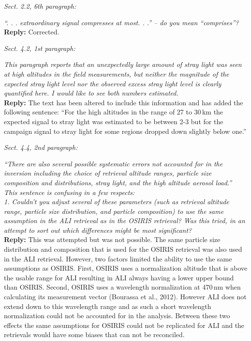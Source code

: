 \documentclass[12pt, notitlepage]{article}
\begin{document}
\textit{Sect. 2.2, 6th paragraph:}

\textit{``. . . extraordinary signal compresses at most. . .'' – do you mean ``comprises''?}\\

\textbf{Reply:} Corrected.

\hrulefill

\textit{Sect. 4.2, 1st paragraph:}

\textit{This paragraph reports that an unexpectedly large amount of stray light was seen at
high altitudes in the field measurements, but neither the magnitude of the expected
stray light level nor the observed excess stray light level is clearly quantified here. I
would like to see both numbers estimated.}\\

\textbf{Reply:} The text has been altered to include this information and has added the following sentence: ``For the high altitudes in the range of 27 to 30\,\unit{km} the expected signal to stray light was estimated to be between 2-3 but for the campaign signal to stray light for some regions dropped down slightly below one.''

\hrulefill

\textit{Sect. 4.4, 2nd paragraph:}

\textit{``There are also several possible systematic errors not accounted for in the inversion
including the choice of retrieval altitude ranges, particle size composition and distributions,
stray light, and the high altitude aerosol load.''}\\

\textit{This sentence is confusing in a few respects:}\\

\textit{1. Couldn't you adjust several of these parameters (such as retrieval altitude range,
particle size distribution, and particle composition) to use the same assumption in the
ALI retrieval as in the OSIRIS retrieval? Was this tried, in an attempt to sort out which
differences might be most significant?}\\

\textbf{Reply:} This was attempted but was not possible. The same particle size distribution and composition
that is used for the OSIRIS retrieval was also used in the ALI retrieval.  However, two factors limited the ability to use the same assumptions as OSIRIS. First, OSIRIS uses a normalization altitude that is above the usable range for ALI resulting in ALI always having a lower upper bound than OSIRIS. Second, OSIRIS uses a wavelength normalization at 470\,nm when calculating its measurement vector (Bourassa et al., 2012). However ALI does not extend down to this wavelength range and as such a short wavelength normalization could not be accounted for in the analysis. Between these two effects the same assumptions for OSIRIS could not be replicated for ALI and the retrievals would have some biases that can not be reconciled.\\
\end{document}
